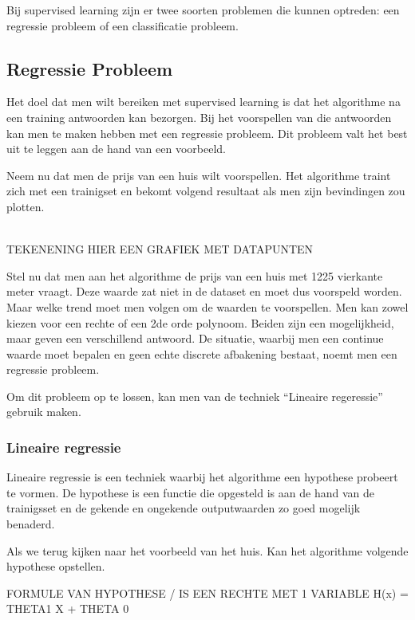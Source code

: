 Bij supervised learning zijn er twee soorten problemen die kunnen optreden: een regressie probleem of een classificatie probleem.

\subsection{Regressie Probleem}\label{Regressie Probleem}

Het doel dat men wilt bereiken met supervised learning is dat het algorithme na een training antwoorden kan bezorgen. Bij het voorspellen van die antwoorden kan men te maken hebben met een regressie probleem. Dit probleem valt het best uit te leggen aan de hand van een voorbeeld.

Neem nu dat men de prijs van een huis wilt voorspellen.
Het algorithme traint zich met een trainigset en bekomt volgend resultaat als men zijn bevindingen zou plotten.

\\
TEKENENING HIER EEN GRAFIEK MET DATAPUNTEN 
\newline

Stel nu dat men aan het algorithme de prijs van een huis met 1225 vierkante meter vraagt. Deze waarde zat niet in de dataset en moet dus voorspeld worden. Maar welke trend moet men volgen om de waarden te voorspellen. Men kan zowel kiezen voor een rechte of een 2de orde polynoom. Beiden zijn een mogelijkheid, maar geven een verschillend antwoord. De situatie, waarbij men een continue waarde moet bepalen en geen echte discrete afbakening bestaat, noemt men een regressie probleem.

Om dit probleem op te lossen, kan men van de techniek ``Lineaire regeressie'' gebruik maken.

\subsubsection{Lineaire regressie}\label{Lineaire regressie}

Lineaire regressie is een techniek waarbij het algorithme een hypothese probeert te vormen. De hypothese is een functie die opgesteld is aan de hand van de trainigsset en de gekende en ongekende outputwaarden zo goed mogelijk benaderd.

Als we terug kijken naar het voorbeeld van het huis. Kan het algorithme volgende hypothese opstellen.

\newline 
FORMULE VAN HYPOTHESE / IS EEN RECHTE MET 1 VARIABLE H(x) = THETA1 X + THETA 0
\newline

